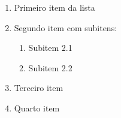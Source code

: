 
\begin{enumerate}
    \item Primeiro item da lista
    \item Segundo item com subitens:
    \begin{enumerate}
        \item Subitem 2.1
        \item Subitem 2.2
    \end{enumerate}
    \item Terceiro item
    \item Quarto item
\end{enumerate}







